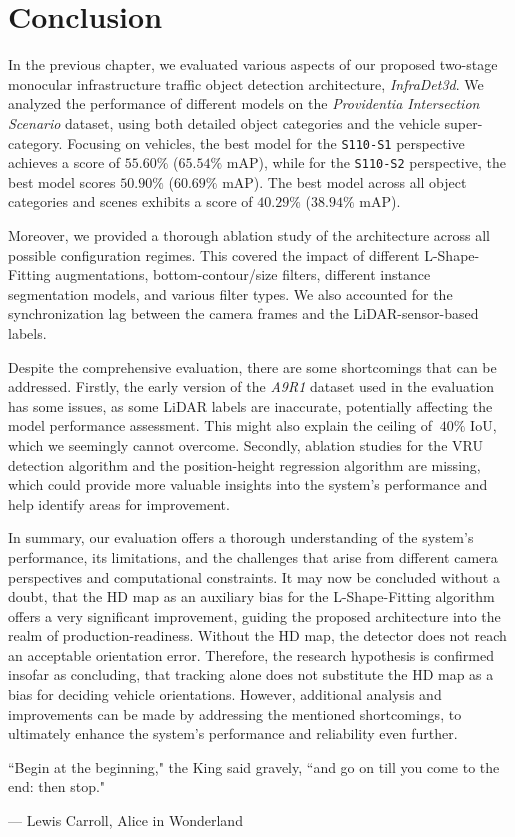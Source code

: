 
\chapter{Conclusion}
\label{ch:conclusion}

In the previous chapter, we evaluated various aspects of our proposed two-stage monocular infrastructure traffic object detection architecture, \textit{InfraDet3d}.
We analyzed the performance of different models on the \textit{Providentia Intersection Scenario} dataset, using both detailed object categories and the vehicle super-category.
Focusing on vehicles, the best model for the \texttt{S110-S1} perspective achieves a score of $55.60\%$ ($65.54\%$ mAP), while for the \texttt{S110-S2} perspective, the best model scores $50.90\%$ ($60.69\%$ mAP).
The best model across all object categories and scenes exhibits a score of $40.29\%$ ($38.94\%$ mAP).

Moreover, we provided a thorough ablation study of the architecture across all possible configuration regimes.
This covered the impact of different L-Shape-Fitting augmentations, bottom-contour/size filters, different instance segmentation models, and various filter types.
We also accounted for the synchronization lag between the camera frames and the LiDAR-sensor-based labels.

Despite the comprehensive evaluation, there are some shortcomings that can be addressed.
Firstly, the early version of the \textit{A9R1} dataset used in the evaluation has some issues, as some LiDAR labels are inaccurate, potentially affecting the model performance assessment.
This might also explain the ceiling of $~40\%$ IoU, which we seemingly cannot overcome.
Secondly, ablation studies for the VRU detection algorithm and the position-height regression algorithm are missing, which could provide more valuable insights into the system's performance and help identify areas for improvement.

In summary, our evaluation offers a thorough understanding of the system's performance, its limitations, and the challenges that arise from different camera perspectives and computational constraints.
It may now be concluded without a doubt, that the HD map as an auxiliary bias for the L-Shape-Fitting algorithm offers a very significant improvement, guiding the proposed architecture into the realm of production-readiness.
Without the HD map, the detector does not reach an acceptable orientation error.
Therefore, the research hypothesis is confirmed insofar as concluding, that tracking alone does not substitute the HD map as a bias for deciding vehicle orientations.
However, additional analysis and improvements can be made by addressing the mentioned shortcomings, to ultimately enhance the system's performance and reliability even further.

\par\vspace*{\fill}
\epigraph{``Begin at the beginning," the King said gravely, ``and go on till you come to the end: then stop."}{--- \textup{Lewis Carroll}, Alice in Wonderland}
